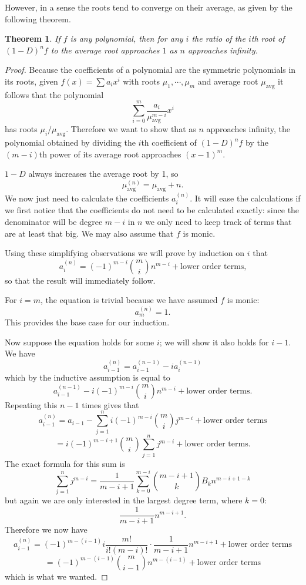 \documentclass[11pt]{article}
\DeclareMathOperator{\avg}{avg}
\newtheorem{theorem}{Theorem}[section]
\begin{document}
However, in a sense the roots tend to converge on their average, as given by the following theorem.
\begin{theorem}
	If $f$ is any polynomial, then for any $i$ the ratio of the $i$th root of $(1-D)^nf$ to the average root approaches $1$ as $n$ approaches infinity.
\end{theorem}
\begin{proof}
	Because the coefficients of a polynomial are the symmetric polynomials in its roots, given $f(x)=\sum a_i x^i$ with roots $\mu_1,\cdots,\mu_m$ and average root $\mu_{\avg}$ it follows that the polynomial
		\[ \sum_{i=0}^m \frac{a_i}{\mu_{\avg}^{m-i}}x^i \]
	has roots $\mu_i/\mu_{\avg}$. Therefore we want to show that as $n$ approaches infinity, the polynomial obtained by dividing the $i$th coefficient of $(1-D)^n f$ by the $(m-i)$th power of its average root approaches $(x-1)^m$.
	
	$1-D$ always increases the average root by 1, so
		\[ \mu_{\avg}^{(n)} = \mu_{\avg}+n. \]
	We now just need to calculate the coefficients $a_i^{(n)}$. It will ease the calculations if we first notice that the coefficients do not need to be calculated exactly: since the denominator will be degree $m-i$ in $n$ we only need to keep track of terms that are at least that big. We may also assume that $f$ is monic.
	
	Using these simplifying observations we will prove by induction on $i$ that
		\[ a_{i}^{(n)} = (-1)^{m-i}\binom{m}{i}n^{m-i} + \text{lower order terms,} \]
	so that the result will immediately follow.
	
	For $i=m$, the equation is trivial because we have assumed $f$ is monic:
		\[ a_m^{(n)} = 1. \]
	This provides the base case for our induction.
	
	Now suppose the equation holds for some $i$; we will show it also holds for $i-1$. We have
		\[ a_{i-1}^{(n)} = a_{i-1}^{(n-1)} - i a_i^{(n-1)} \]
	which by the inductive assumption is equal to
		\[ a_{i-1}^{(n-1)} - i (-1)^{m-i}\binom{m}{i}n^{m-i} + \text{lower order terms}. \]
	Repeating this $n-1$ times gives that
		\[ a_{i-1}^{(n)} = a_{i-1} - \sum_{j=1}^n i (-1)^{m-i} \binom{m}{i} j^{m-i} + \text{lower order terms} \]
		\[ = i (-1)^{m-i+1} \binom{m}{i} \sum_{j=1}^n j^{m-i} + \text{lower order terms.} \]
	The exact formula for this sum is
		\[ \sum_{j=1}^n j^{m-i} = \frac{1}{m-i+1}\sum_{k=0}^{m-i} \binom{m-i+1}{k}B_k n^{m-i+1-k} \]
	but again we are only interested in the largest degree term, where $k=0$:
		\[ \frac{1}{m-i+1}n^{m-i+1}. \]
	Therefore we now have
		\[ a_{i-1}^{(n)} = (-1)^{m-(i-1)} i \frac{m!}{i!(m-i)!} \cdot \frac{1}{m-i+1} n^{m-i+1} + \text{lower order terms} \]
		\[ = (-1)^{m-(i-1)} \binom{m}{i-1} n^{m-(i-1)} + \text{lower order terms}\]
	which is what we wanted.
\end{proof}
\end{document}
